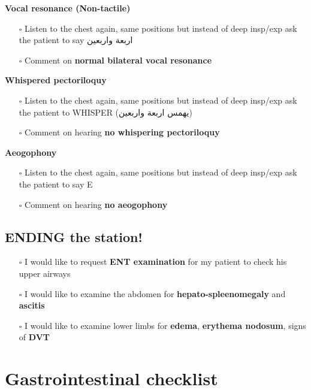 \documentclass[
  13.5pt,
  a4paper,
  DIV=11,
  numbers=noendperiod]{scrreprt}
\providecommand{\tightlist}{%
  \setlength{\itemsep}{0pt}\setlength{\parskip}{0pt}}
\begin{document}
\textbf{Vocal resonance (Non-tactile)}

\begin{itemize}
\tightlist
\item[$\square$]
  Listen to the chest again, same positions but instead of deep insp/exp
  ask the patient to say اربعة واربعين
\item[$\square$]
  Comment on \textbf{normal bilateral vocal resonance}
\end{itemize}

\textbf{Whispered pectoriloquy}

\begin{itemize}
\tightlist
\item[$\square$]
  Listen to the chest again, same positions but instead of deep insp/exp
  ask the patient to WHISPER (يهمس اربعة واربعين)
\item[$\square$]
  Comment on hearing \textbf{no whispering pectoriloquy}
\end{itemize}

\textbf{Aeogophony}

\begin{itemize}
\tightlist
\item[$\square$]
  Listen to the chest again, same positions but instead of deep insp/exp
  ask the patient to say E
\item[$\square$]
  Comment on hearing \textbf{no aeogophony}
\end{itemize}

\section{\texorpdfstring{\textbf{ENDING the
station!}}{ENDING the station!}}\label{ending-the-station-1}

\begin{itemize}
\tightlist
\item[$\square$]
  I would like to request \textbf{ENT examination} for my patient to
  check his upper airways
\item[$\square$]
  I would like to examine the abdomen for \textbf{hepato-spleenomegaly}
  and \textbf{ascitis}
\item[$\square$]
  I would like to examine lower limbs for \textbf{edema},
  \textbf{erythema nodosum}, signs of \textbf{DVT}
\end{itemize}


\chapter{Gastrointestinal checklist}\label{gastrointestinal-checklist}
\end{document}
